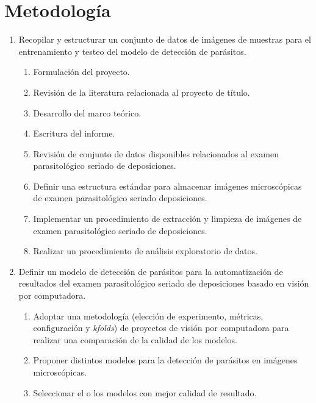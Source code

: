 \documentclass[letter,12pt]{report}
\begin{document}
\section{Metodología}
\begin{enumerate}\justifying
    \item Recopilar y estructurar un conjunto de datos de imágenes de muestras para el entrenamiento y testeo del modelo de detección de parásitos.
        \begin{enumerate}
            \item Formulación del proyecto.
            \item Revisión de la literatura relacionada al proyecto de título.
            \item Desarrollo del marco teórico.
            \item Escritura del informe.
            \item Revisión de conjunto de datos disponibles relacionados al examen
                parasitológico seriado de deposiciones.
            \item Definir una estructura estándar para almacenar imágenes microscópicas
                de examen parasitológico seriado deposiciones.
            \item Implementar un procedimiento de extracción y limpieza de imágenes de
                examen parasitológico seriado de deposiciones.
            \item Realizar un procedimiento de análisis exploratorio de datos.
        \end{enumerate}

    \item Definir un modelo de detección de parásitos para la automatización de resultados del examen parasitológico seriado de deposiciones basado en visión por computadora.
        \begin{enumerate}
            \item Adoptar una metodología (elección de experimento, métricas, configuración
                y \textit{kfolds}) de proyectos de visión por computadora para realizar una
                comparación de la calidad de los modelos.
            \item Proponer distintos modelos para la detección de parásitos en imágenes
                microscópicas.
            \item Seleccionar el o los modelos con mejor calidad de resultado.
        \end{enumerate}


\end{enumerate}
\end{document}
